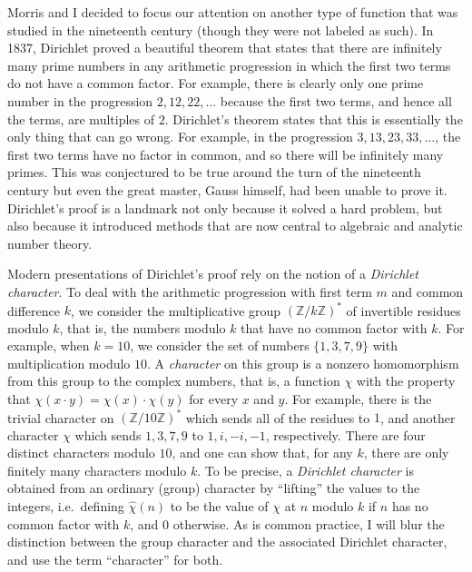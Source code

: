 \documentclass[11pt]{article}
\newcommand{\ZZ}{\mathbb{Z}}
\begin{document}
Morris and I decided to focus our attention on another type of function that was studied in the nineteenth century (though they were not labeled as such). In 1837, Dirichlet proved a beautiful theorem that states that there are infinitely many prime numbers in any arithmetic progression in which the first two terms do not have a common factor. For example, there is clearly only one prime number in the progression $2, 12, 22, \ldots$ because the first two terms, and hence all the terms, are multiples of $2$. Dirichlet's theorem states that this is essentially the only thing that can go wrong. For example, in the progression $3, 13, 23, 33, \ldots$, the first two terms have no factor in common, and so there will be infinitely many primes. This was conjectured to be true around the turn of the nineteenth century but even the great master, Gauss himself, had been unable to prove it. Dirichlet's proof is a landmark not only because it solved a hard problem, but also because it introduced methods that are now central to algebraic and analytic number theory.

Modern presentations of Dirichlet's proof rely on the notion of a \emph{Dirichlet character}. To deal with the arithmetic progression with first term $m$ and common difference $k$, we consider the multiplicative group $(\ZZ/k\ZZ)^*$ of invertible residues modulo $k$, that is, the numbers modulo $k$ that have no common factor with $k$. For example, when $k = 10$, we consider the set of numbers $\{1, 3, 7, 9\}$ with multiplication modulo $10$. A \emph{character} on this group is a nonzero homomorphism from this group to the complex numbers, that is, a function $\chi$ with the property that $\chi(x \cdot y) = \chi(x) \cdot \chi(y)$ for every $x$ and $y$. For example, there is the trivial character on $(\ZZ/10\ZZ)^*$ which sends all of the residues to $1$, and another character $\chi$ which sends $1, 3, 7, 9$ to $1, i, -i, -1$, respectively. There are four distinct characters modulo $10$, and one can show that, for any $k$, there are only finitely many characters modulo $k$. To be precise, a \emph{Dirichlet character} is obtained from an ordinary (group) character by ``lifting'' the values to the integers, i.e.~defining $\hat \chi(n)$ to be the value of $\chi$ at $n$ modulo $k$ if $n$ has no common factor with $k$, and $0$ otherwise. As is common practice, I will blur the distinction between the group character and the associated Dirichlet character, and use the term ``character'' for both.
\end{document}
